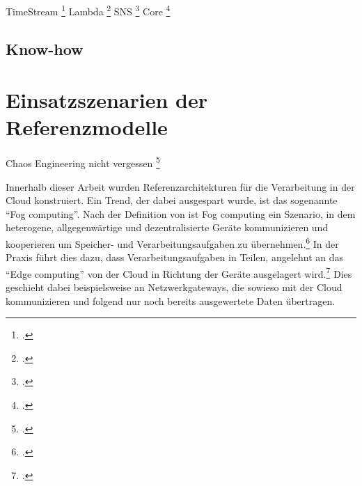 TimeStream \footcite[Vgl.][]{AmazonWebServicesInc..o.J.be}
Lambda \footcite[Vgl.][]{AmazonWebServicesInc..o.J.bf}
\ac{SNS} \footcite[Vgl.][]{AmazonWebServicesInc..o.J.bc}
\AWSIOT{} Core \footcite[Vgl.][]{AmazonWebServicesInc..o.J.az}

\subsection{Know-how}


\section{Einsatzszenarien der Referenzmodelle}


Chaos Engineering nicht vergessen \footcite[Vgl.][]{Augsten.2020}

Innerhalb dieser Arbeit wurden Referenzarchitekturen für die Verarbeitung in der Cloud konstruiert. Ein Trend, der dabei ausgespart wurde, ist das sogenannte \enquote{Fog computing}. Nach der Definition von \citeauthor{Vaquero.2014} ist Fog computing ein Szenario, in dem heterogene, allgegenwärtige und dezentralisierte Geräte kommunizieren und kooperieren um Speicher- und Verarbeitungsaufgaben zu übernehmen.\footcite[Vgl.][30\psq]{Vaquero.2014} In der Praxis führt dies dazu, dass Verarbeitungsaufgaben in Teilen, angelehnt an das \enquote{Edge computing} von der Cloud in Richtung der Geräte ausgelagert wird.\footcite[Vgl.][]{Bonomi.2012} Dies geschieht dabei beispielsweise an Netzwerkgateways, die sowieso mit der Cloud kommunizieren und folgend nur noch bereits ausgewertete Daten übertragen.